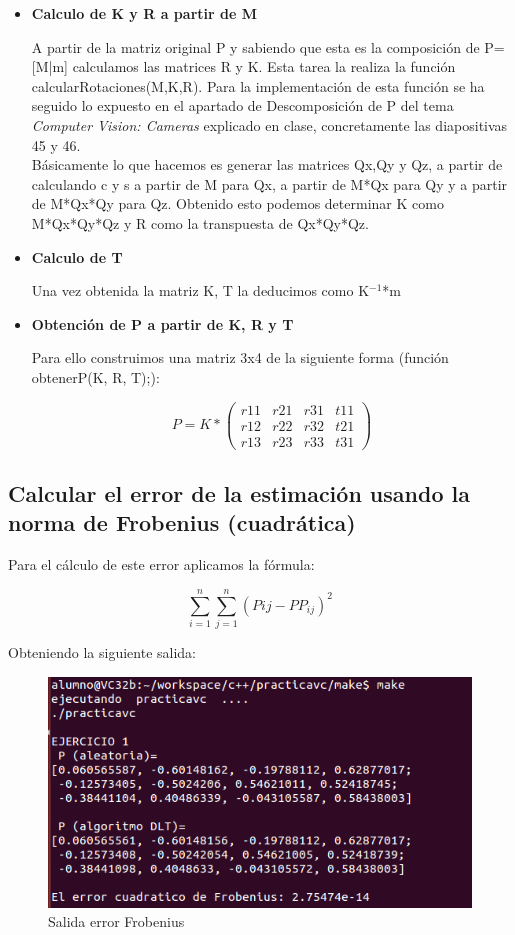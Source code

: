 \begin{itemize}
	\item \textbf{Calculo de K y R a partir de M}
	
	A partir de la matriz original P y sabiendo que esta es la composición de P=[M|m] calculamos las matrices R y K. Esta tarea la realiza la función calcularRotaciones(M,K,R). Para la implementación de esta función se ha seguido lo expuesto en el apartado de Descomposición de P del tema \textit{Computer Vision: Cameras} explicado en clase, concretamente las diapositivas 45 y 46.\\
	
	Básicamente lo que hacemos es generar las matrices Qx,Qy y Qz, a partir de  calculando c y s a partir de M para Qx, a partir de M*Qx para Qy y a partir de M*Qx*Qy para Qz. Obtenido esto podemos determinar K como M*Qx*Qy*Qz y  R como la transpuesta de Qx*Qy*Qz.\\
	
	
	\item \textbf{Calculo de T}
	
	Una vez obtenida la matriz K, T la deducimos como K$^{-1}$*m
	
	\item \textbf{Obtención de P a partir de K, R y T}
	
	Para ello construimos una matriz 3x4  de la siguiente forma (función obtenerP(K, R, T);):
	
	\[P = K* \left( \begin{array}{cccc}
	r11 & r21 & r31 & t11\\
	r12 & r22 & r32 & t21\\
	r13 & r23 & r33 & t31\end{array} \right)\] 
	
\end{itemize}
	
\subsection{Calcular el error de la estimación usando la norma de Frobenius (cuadrática)}

Para  el cálculo de este error aplicamos la fórmula:

\[
\sum_{i=1}^{n}\sum_{j=1}^{n}(P{ij}-PP_{ij})^{2}
\]

Obteniendo la siguiente salida:

\begin{figure}[H]
\centering
\includegraphics[width=0.7\linewidth]{salida-ej1}
\caption{Salida error Frobenius}
\label{fig:salida-ej1}
\end{figure}

